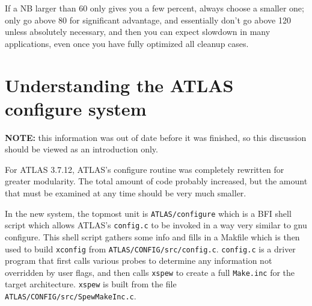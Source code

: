\documentclass[11pt]{article}
\begin{document}
If a NB larger than 60 only gives you a few percent, always choose a 
smaller one; only go above 80 for significant advantage, and essentially
don't go above 120 unless absolutely necessary, and then you can expect
slowdown in many applications, even once you have fully optimized all
cleanup cases.

\newpage
\section{Understanding the ATLAS configure system}
{\bf NOTE:} this information was out of date before it was finished, so
this discussion should be viewed as an introduction only.

For ATLAS 3.7.12, ATLAS's configure routine was completely rewritten for
greater modularity.  The total amount of code probably increased, but the
amount that must be examined at any time should be very much smaller. 

In the new system, the topmost unit is {\tt ATLAS/configure} which is a 
BFI shell script which allows ATLAS's {\tt config.c} to be invoked in a
way very similar to gnu configure.  This shell script gathers some info
and fills in a Makfile which is then used to build {\tt xconfig} from
{\tt ATLAS/CONFIG/src/config.c}.  {\tt config.c} is a driver program
that first calls various probes to determine any information not overridden by
user flags, and then calls {\tt xspew} to create a full {\tt Make.inc} for
the target architecture.  {\tt xspew} is built from the file 
{\tt ATLAS/CONFIG/src/SpewMakeInc.c}.  
\end{document}
